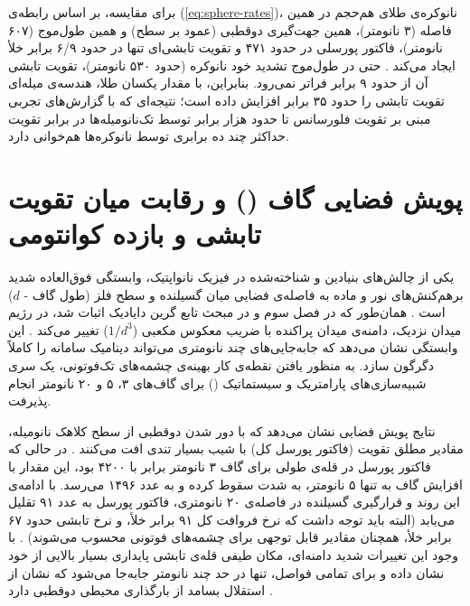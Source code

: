 \documentclass[12pt,a4paper]{report}
\begin{document}
برای مقایسه، بر اساس رابطه‌ی (\ref{eq:sphere-rates})، نانوکره‌ی طلای هم‌حجم در همین فاصله (۳ نانومتر)، همین جهت‌گیری دوقطبی (عمود بر سطح) و همین طول‌موج (۶۰۷ نانومتر)، فاکتور پورسلی در حدود ۴۷۱ و تقویت تابشی‌ای تنها در حدود ۶/۹ برابر خلأ ایجاد می‌کند \cite{ruppin,mertens}. حتی در طول‌موج تشدید خود نانوکره (حدود ۵۳۰ نانومتر)، تقویت تابشی آن از حدود ۹ برابر فراتر نمی‌رود. بنابراین، با مقدار یکسان طلا، هندسه‌ی میله‌ای تقویت تابشی را حدود ۳۵ برابر افزایش داده است؛ نتیجه‌ای که با گزارش‌های تجربی مبنی بر تقویت فلورسانس تا حدود هزار برابر توسط تک‌نانومیله‌ها \cite{khatua} در برابر تقویت حداکثر چند ده برابری توسط نانوکره‌ها \cite{anger,kuhn} هم‌خوانی دارد.

\section{پویش فضایی گاف () و رقابت میان تقویت تابشی و بازده کوانتومی}
یکی از چالش‌های بنیادین و شناخته‌شده در فیزیک نانواپتیک، وابستگی فوق‌العاده شدید برهم‌کنش‌های نور و ماده به فاصله‌ی فضایی میان گسیلنده و سطح فلز (طول گاف - $d$) است \cite{novotny,anger}. همان‌طور که در فصل سوم و در مبحث تابع گرین دایادیک اثبات شد، در رژیم میدان نزدیک، دامنه‌ی میدان پراکنده با ضریب معکوس مکعبی ($1/d^3$) تغییر می‌کند \cite{novotny}. این وابستگی نشان می‌دهد که جابه‌جایی‌های چند نانومتری می‌تواند دینامیک سامانه را کاملاً دگرگون سازد. به منظور یافتن نقطه‌ی کار بهینه‌ی چشمه‌های تک‌فوتونی، یک سری شبیه‌سازی‌های پارامتریک و سیستماتیک () برای گاف‌های ۳، ۵ و ۲۰ نانومتر انجام پذیرفت.

نتایج پویش فضایی نشان می‌دهد که با دور شدن دوقطبی از سطح کلاهک نانومیله، مقادیر مطلق تقویت (فاکتور پورسل کل) با شیب بسیار تندی افت می‌کنند \cite{novotny,maier}. در حالی که فاکتور پورسل در قله‌ی طولی برای گاف ۳ نانومتر برابر با ۴۲۰۰ بود، این مقدار با افزایش گاف به تنها ۵ نانومتر، به شدت سقوط کرده و به عدد ۱۴۹۶ می‌رسد. با ادامه‌ی این روند و قرارگیری گسیلنده در فاصله‌ی ۲۰ نانومتری، فاکتور پورسل به عدد ۹۱ تقلیل می‌یابد (البته باید توجه داشت که نرخ فروافت کل ۹۱ برابر خلأ، و نرخ تابشی حدود ۶۷ برابر خلأ، همچنان مقادیر قابل توجهی برای چشمه‌های فوتونی محسوب می‌شوند) \cite{novotny}. با وجود این تغییرات شدید دامنه‌ای، مکان طیفی قله‌ی تابشی پایداری بسیار بالایی از خود نشان داده و برای تمامی فواصل، تنها در حد چند نانومتر جابه‌جا می‌شود که نشان از استقلال بسامد  از بارگذاری محیطی دوقطبی دارد \cite{maier}.
\end{document}
